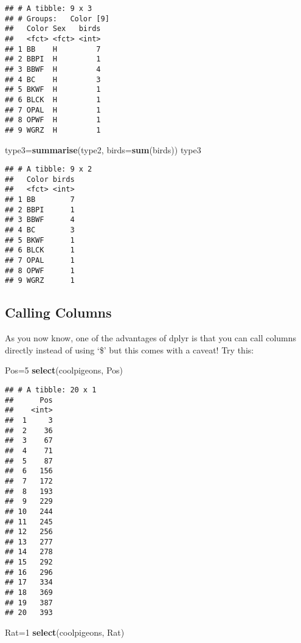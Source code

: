 \documentclass[]{article}
\newenvironment{Shaded}{\begin{snugshade}}{\end{snugshade}}
\newcommand{\KeywordTok}[1]{\textcolor[rgb]{0.13,0.29,0.53}{\textbf{#1}}}
\newcommand{\DataTypeTok}[1]{\textcolor[rgb]{0.13,0.29,0.53}{#1}}
\newcommand{\DecValTok}[1]{\textcolor[rgb]{0.00,0.00,0.81}{#1}}
\newcommand{\NormalTok}[1]{#1}
\begin{document}
\begin{verbatim}
## # A tibble: 9 x 3
## # Groups:   Color [9]
##   Color Sex   birds
##   <fct> <fct> <int>
## 1 BB    H         7
## 2 BBPI  H         1
## 3 BBWF  H         4
## 4 BC    H         3
## 5 BKWF  H         1
## 6 BLCK  H         1
## 7 OPAL  H         1
## 8 OPWF  H         1
## 9 WGRZ  H         1
\end{verbatim}

\begin{Shaded}
\begin{Highlighting}[]
\NormalTok{type3=}\KeywordTok{summarise}\NormalTok{(type2, }\DataTypeTok{birds=}\KeywordTok{sum}\NormalTok{(birds))}
\NormalTok{type3}
\end{Highlighting}
\end{Shaded}

\begin{verbatim}
## # A tibble: 9 x 2
##   Color birds
##   <fct> <int>
## 1 BB        7
## 2 BBPI      1
## 3 BBWF      4
## 4 BC        3
## 5 BKWF      1
## 6 BLCK      1
## 7 OPAL      1
## 8 OPWF      1
## 9 WGRZ      1
\end{verbatim}

\subsection{Calling Columns}\label{calling-columns}

As you now know, one of the advantages of dplyr is that you can call
columns directly instead of using `\$' but this comes with a caveat! Try
this:

\begin{Shaded}
\begin{Highlighting}[]
\NormalTok{Pos=}\DecValTok{5}
\KeywordTok{select}\NormalTok{(coolpigeons, Pos)}
\end{Highlighting}
\end{Shaded}

\begin{verbatim}
## # A tibble: 20 x 1
##      Pos
##    <int>
##  1     3
##  2    36
##  3    67
##  4    71
##  5    87
##  6   156
##  7   172
##  8   193
##  9   229
## 10   244
## 11   245
## 12   256
## 13   277
## 14   278
## 15   292
## 16   296
## 17   334
## 18   369
## 19   387
## 20   393
\end{verbatim}

\begin{Shaded}
\begin{Highlighting}[]
\NormalTok{Rat=}\DecValTok{1}
\KeywordTok{select}\NormalTok{(coolpigeons, Rat)}
\end{Highlighting}
\end{Shaded}
\end{document}

